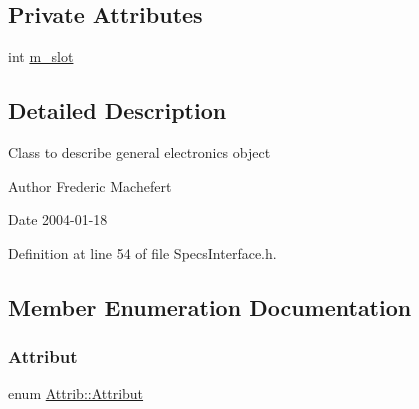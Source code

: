 \subsection*{Private Attributes}
\begin{DoxyCompactItemize}
\item 
int \hyperlink{classSpecsInterface_a7030d3ba54c826b3524f72e57b82ece6}{m\+\_\+slot}
\end{DoxyCompactItemize}


\subsection{Detailed Description}
Class to describe general electronics object

\begin{DoxyAuthor}{Author}
Frederic Machefert 
\end{DoxyAuthor}
\begin{DoxyDate}{Date}
2004-\/01-\/18 
\end{DoxyDate}


Definition at line 54 of file Specs\+Interface.\+h.



\subsection{Member Enumeration Documentation}
\mbox{\label{classAttrib_a69e171d7cc6417835a5a306d3c764235}} 
\subsubsection{\texorpdfstring{Attribut}{Attribut}}
{\footnotesize\ttfamily enum \hyperlink{classAttrib_a69e171d7cc6417835a5a306d3c764235}{Attrib\+::\+Attribut}\hspace{0.3cm}{\ttfamily [inherited]}}


